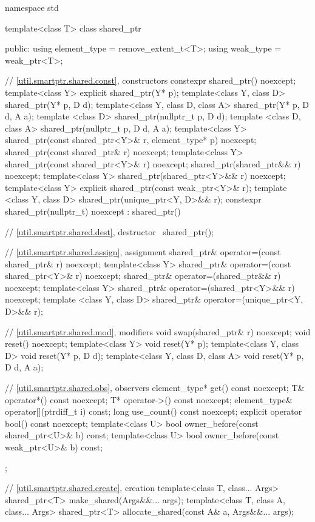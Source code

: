 \begin{codeblock}
namespace std {
  template<class T> class shared_ptr {
  public:
    using element_type = remove_extent_t<T>;
    using weak_type    = weak_ptr<T>;

    // \ref{util.smartptr.shared.const}, constructors
    constexpr shared_ptr() noexcept;
    template<class Y> explicit shared_ptr(Y* p);
    template<class Y, class D> shared_ptr(Y* p, D d);
    template<class Y, class D, class A> shared_ptr(Y* p, D d, A a);
    template <class D> shared_ptr(nullptr_t p, D d);
    template <class D, class A> shared_ptr(nullptr_t p, D d, A a);
    template<class Y> shared_ptr(const shared_ptr<Y>& r, element_type* p) noexcept;
    shared_ptr(const shared_ptr& r) noexcept;
    template<class Y> shared_ptr(const shared_ptr<Y>& r) noexcept;
    shared_ptr(shared_ptr&& r) noexcept;
    template<class Y> shared_ptr(shared_ptr<Y>&& r) noexcept;
    template<class Y> explicit shared_ptr(const weak_ptr<Y>& r);
    template <class Y, class D> shared_ptr(unique_ptr<Y, D>&& r);
    constexpr shared_ptr(nullptr_t) noexcept : shared_ptr() { }

    // \ref{util.smartptr.shared.dest}, destructor
    ~shared_ptr();

    // \ref{util.smartptr.shared.assign}, assignment
    shared_ptr& operator=(const shared_ptr& r) noexcept;
    template<class Y> shared_ptr& operator=(const shared_ptr<Y>& r) noexcept;
    shared_ptr& operator=(shared_ptr&& r) noexcept;
    template<class Y> shared_ptr& operator=(shared_ptr<Y>&& r) noexcept;
    template <class Y, class D> shared_ptr& operator=(unique_ptr<Y, D>&& r);

    // \ref{util.smartptr.shared.mod}, modifiers
    void swap(shared_ptr& r) noexcept;
    void reset() noexcept;
    template<class Y> void reset(Y* p);
    template<class Y, class D> void reset(Y* p, D d);
    template<class Y, class D, class A> void reset(Y* p, D d, A a);

    // \ref{util.smartptr.shared.obs}, observers
    element_type* get() const noexcept;
    T& operator*() const noexcept;
    T* operator->() const noexcept;
    element_type& operator[](ptrdiff_t i) const;
    long use_count() const noexcept;
    explicit operator bool() const noexcept;
    template<class U> bool owner_before(const shared_ptr<U>& b) const;
    template<class U> bool owner_before(const weak_ptr<U>& b) const;
  };

  // \ref{util.smartptr.shared.create},  creation
  template<class T, class... Args>
    shared_ptr<T> make_shared(Args&&... args);
  template<class T, class A, class... Args>
    shared_ptr<T> allocate_shared(const A& a, Args&&... args);

}
\end{codeblock}
